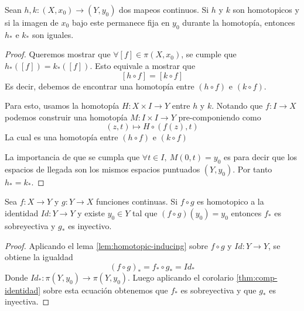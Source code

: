 \begin{lema} \label{lem:homotopic-inducing}
  Sean \(h,k : (X, x_0) \to (Y, y_0)\) dos mapeos continuos. Si \(h\) y
  \(k\) son homotopicos y si la imagen de \(x_0\) bajo este permanece
  fija en \(y_0\) durante la homotopía, entonces \(h_*\) e \(k_*\) son iguales.
\end{lema}
\begin{proof}
  Queremos mostrar que \(\forall [f] \in \pi (X,x_0)\), se cumple que
  \(h_* ([f]) = k_* ([f])\). Esto equivale a mostrar que
  \[ [h \circ f] = [k \circ f] \]
  Es decir, debemos de encontrar una homotopía entre \((h \circ f)\) e \(
  (k \circ f)\).

  Para esto, usamos la homotopía \(H : X \times I \to Y \) entre \(h\) y
  \(k\). Notando que \(f : I \to X\) podemos construir una homotopía \(M
  : I \times I \to Y \) pre-componiendo como
  \[ (z, t) \mapsto H \circ (f(z), t) \]
  La cual es una homotopía entre \((h \circ f)\) e \((k \circ f)\)

  La importancia de que se cumpla que \( \forall t \in I,\ M (0, t) =
  y_0\) es para decir que los espacios de llegada son los mismos
  espacios puntuados \((Y,y_0)\). Por tanto \(h_* = k_*\).
\end{proof}
\begin{teorema} \label{thm:comp-identidad-homotopia}
  Sea \(f : X \to Y\) y \(g : Y \to X\) funciones continuas. Si \(f
  \circ g\) es homotopico a la identidad \( Id : Y \to Y\) y existe
  \(y_0 \in Y\) tal que \( (f \circ g ) (y_0) = y_0 \) entonces
  \(f_*\) es sobreyectiva y \(g_*\) es inyectivo.
\end{teorema}
\begin{proof}
  Aplicando el lema \ref{lem:homotopic-inducing} sobre \(f \circ g \) y
  \( Id : Y \to Y\), se obtiene la igualdad
  \[ (f \circ g)_{*} = f_* \circ g_* = Id_* \]
  Donde \(Id_* : \pi (Y, y_0) \to \pi (Y, y_0)\). Luego aplicando el corolario
  \ref{thm:comp-identidad} sobre esta ecuación obtenemos que \(f_*\) es
  sobreyectiva y que \(g_*\) es inyectiva.
\end{proof}

